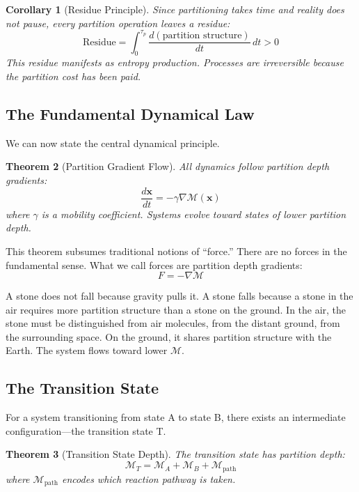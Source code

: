 ﻿\documentclass[twocolumn,10pt,a4paper]{article}
\newtheorem{theorem}{Theorem}[section]
\newtheorem{corollary}[theorem]{Corollary}
\theoremstyle{definition}
\theoremstyle{remark}
\newcommand{\Depth}{\mathcal{M}}
\begin{document}
\begin{corollary}[Residue Principle]
\label{cor:residue}
Since partitioning takes time and reality does not pause, every partition operation leaves a residue:
\begin{equation}
    \text{Residue} = \int_0^{\tau_p} \frac{d(\text{partition structure})}{dt} \, dt > 0
\end{equation}
This residue manifests as entropy production. Processes are irreversible because the partition cost has been paid.
\end{corollary}

\subsection{The Fundamental Dynamical Law}

We can now state the central dynamical principle.

\begin{theorem}[Partition Gradient Flow]
\label{thm:gradient}
All dynamics follow partition depth gradients:
\begin{equation}
    \frac{d\mathbf{x}}{dt} = -\gamma \nabla\Depth(\mathbf{x})
\end{equation}
where $\gamma$ is a mobility coefficient. Systems evolve toward states of lower partition depth.
\end{theorem}

This theorem subsumes traditional notions of ``force.'' There are no forces in the fundamental sense. What we call forces are partition depth gradients:
\begin{equation}
    F = -\nabla\Depth
\end{equation}

A stone does not fall because gravity pulls it. A stone falls because a stone in the air requires more partition structure than a stone on the ground. In the air, the stone must be distinguished from air molecules, from the distant ground, from the surrounding space. On the ground, it shares partition structure with the Earth. The system flows toward lower $\Depth$.

\subsection{The Transition State}

For a system transitioning from state A to state B, there exists an intermediate configuration---the transition state T.

\begin{theorem}[Transition State Depth]
\label{thm:transition}
The transition state has partition depth:
\begin{equation}
    \Depth_T = \Depth_A + \Depth_B + \Depth_{\mathrm{path}}
\end{equation}
where $\Depth_{\mathrm{path}}$ encodes which reaction pathway is taken.
\end{theorem}
\end{document}
